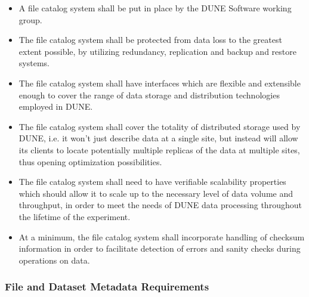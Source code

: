 \begin{itemize}
\item A file catalog system shall be put in place by the DUNE Software working group.


\item The file catalog system shall be protected from data loss to the greatest extent possible, by utilizing redundancy, replication and backup and restore systems.


\item The file catalog system shall have interfaces which are flexible and extensible enough to cover the range of data storage and distribution technologies employed in DUNE.

\item The file catalog system shall cover the totality of distributed storage used by DUNE, i.e. it won't just describe data at a single site, but instead will allow its clients to locate potentially multiple replicas of the data at multiple sites, thus opening optimization possibilities.

\item The file catalog system shall need to have verifiable scalability properties which should allow it to scale up to the necessary level of data volume and throughput, in order to meet the needs of DUNE data processing throughout the lifetime of the experiment.

\item At a minimum, the file catalog system shall incorporate handling of checksum information in order to facilitate detection of errors and sanity checks during operations on data.

\end{itemize}

\subsubsection{File and Dataset Metadata Requirements}
\label{sec:metadata-req}

